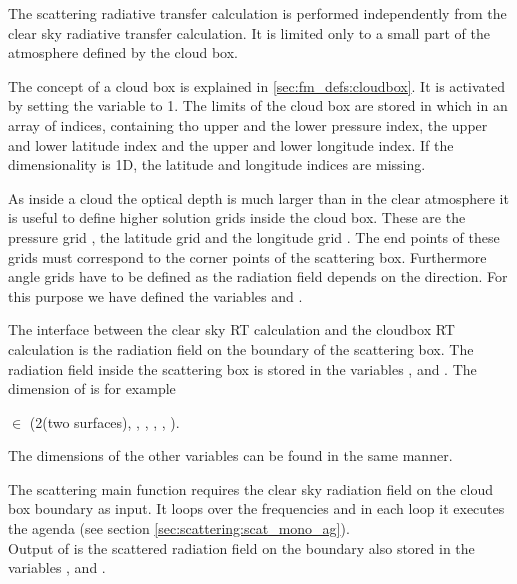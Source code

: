 \label{sec:scattering:scat_meth_rt}

The scattering radiative transfer calculation is performed
independently from the clear sky radiative transfer calculation. It is
limited only to a small part of the atmosphere defined by the cloud box.

\label{sec:scattering:cloudbox}

The concept of a cloud box is explained in
\ref{sec:fm_defs:cloudbox}. It is activated by setting the variable
 to 1. The
limits of the cloud box are stored in 
which in an array of indices, containing tho upper and the lower
pressure index, the upper and lower latitude index and the upper and
lower longitude index. If the dimensionality is 1D, the latitude and longitude
indices are missing.

As inside a cloud the optical depth is much larger than in the clear
atmosphere it is useful to define higher solution grids inside the
cloud box. These are the pressure grid
, the latitude grid  
and the longitude grid . The end points of
these grids must correspond to the corner points of the scattering
box. Furthermore angle grids have to be defined as the radiation
field depends on the direction. For this purpose we have defined the
variables  and .

The interface between the clear sky RT calculation and the cloudbox RT
calculation is the radiation field on the boundary of the scattering
box. The radiation field \StoVec inside the scattering box is stored
in the variables ,  and
. The dimension of   is for
example 
\begin{center}
   $\in$ (2(two surfaces), \ScaLat, \ScaLon, \ScaZa,
\ScaAa, \Frq).
\end{center}
The dimensions of the other variables can be found in the same manner.

\label{sec:scattering:main_function}

The scattering main function  requires the clear sky radiation 
field on the cloud box boundary as input.
It loops over the frequencies and in each loop it executes the agenda 
 (see section \ref{sec:scattering:scat_mono_ag}).\\
Output of  is the scattered radiation field on the
boundary also stored in the variables ,  and
.

